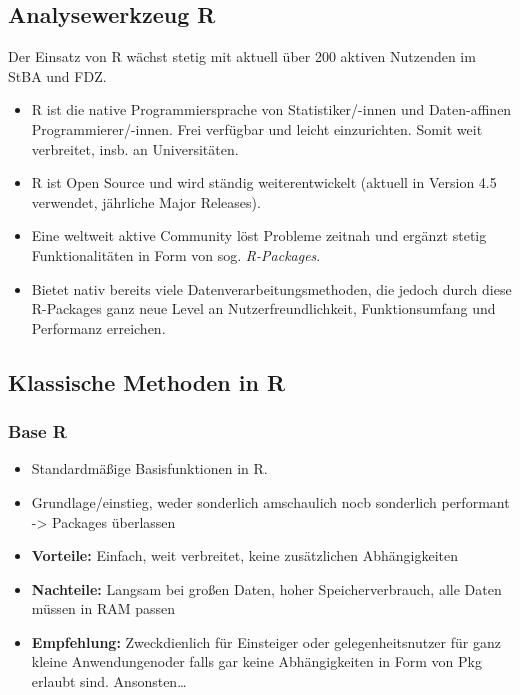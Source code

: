 \documentclass[
  german,
  10pt,
  twoside]{article}
\providecommand{\tightlist}{%
  \setlength{\itemsep}{0pt}\setlength{\parskip}{0pt}}
\begin{document}
\subsection{Analysewerkzeug R}\label{analysewerkzeug-r}

Der Einsatz von R wächst stetig mit aktuell über 200 aktiven Nutzenden
im StBA und FDZ.

\begin{itemize}
\tightlist
\item
  R ist die native Programmiersprache von Statistiker/-innen und
  Daten-affinen Programmierer/-innen. Frei verfügbar und leicht
  einzurichten. Somit weit verbreitet, insb. an Universitäten.
\item
  R ist Open Source und wird ständig weiterentwickelt (aktuell in
  Version 4.5 verwendet, jährliche Major Releases).
\item
  Eine weltweit aktive Community löst Probleme zeitnah und ergänzt
  stetig Funktionalitäten in Form von sog. \emph{R-Packages}.
\item
  Bietet nativ bereits viele Datenverarbeitungsmethoden, die jedoch
  durch diese R-Packages ganz neue Level an Nutzerfreundlichkeit,
  Funktionsumfang und Performanz erreichen.
\end{itemize}

\subsection{Klassische Methoden in R}\label{klassische-methoden-in-r}

\subsubsection{Base R}\label{base-r}

\begin{itemize}
\tightlist
\item
  Standardmäßige Basisfunktionen in R.
\item
  Grundlage/einstieg, weder sonderlich amschaulich nocb sonderlich
  performant -\textgreater{} Packages überlassen
\item
  \textbf{Vorteile:} Einfach, weit verbreitet, keine zusätzlichen
  Abhängigkeiten
\item
  \textbf{Nachteile:} Langsam bei großen Daten, hoher Speicherverbrauch,
  alle Daten müssen in RAM passen
\item
  \textbf{Empfehlung:} Zweckdienlich für Einsteiger oder
  gelegenheitsnutzer für ganz kleine Anwendungenoder falls gar keine
  Abhängigkeiten in Form von Pkg erlaubt sind. Ansonsten\ldots{}
\end{itemize}
\end{document}
